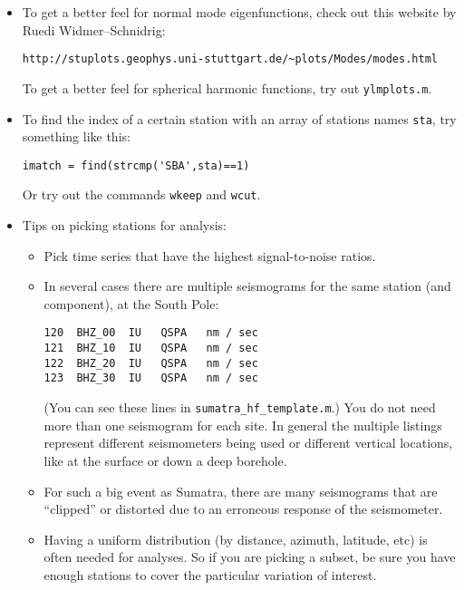 \documentclass[11pt,titlepage,fleqn]{article}
\begin{document}
\begin{itemize}
\begin{itemize}
\end{itemize}


\item To get a better feel for normal mode eigenfunctions, check out this website by Ruedi Widmer--Schnidrig:
%
\begin{verbatim}
http://stuplots.geophys.uni-stuttgart.de/~plots/Modes/modes.html
\end{verbatim}
%
To get a better feel for spherical harmonic functions, try out \verb+ylmplots.m+.


\item To find the index of a certain station with an array of stations names \verb+sta+, try something like this:
%
\begin{verbatim}
imatch = find(strcmp('SBA',sta)==1)
\end{verbatim}
%
Or try out the commands \verb+wkeep+ and \verb+wcut+.



\item Tips on picking stations for analysis:
\begin{itemize}
\item Pick time series that have the highest signal-to-noise ratios.
\item In several cases there are multiple seismograms for the same station (and component), \eg at the South Pole:
%
\begin{spacing}{1.0}
\begin{verbatim}
120  BHZ_00  IU   QSPA   nm / sec
121  BHZ_10  IU   QSPA   nm / sec
122  BHZ_20  IU   QSPA   nm / sec
123  BHZ_30  IU   QSPA   nm / sec
\end{verbatim}
\end{spacing}
%
(You can see these lines in \verb+sumatra_hf_template.m+.)
You do not need more than one seismogram for each site. In general the multiple listings represent different seismometers being used or different vertical locations, like at the surface or down a deep borehole.

\item For such a big event as Sumatra, there are many seismograms that are ``clipped'' or distorted due to an erroneous response of the seismometer.

\item Having a uniform distribution (by distance, azimuth, latitude, etc) is often needed for analyses. So if you are picking a subset, be sure you have enough stations to cover the particular variation of interest.
\end{itemize}

\end{itemize}
\end{document}
